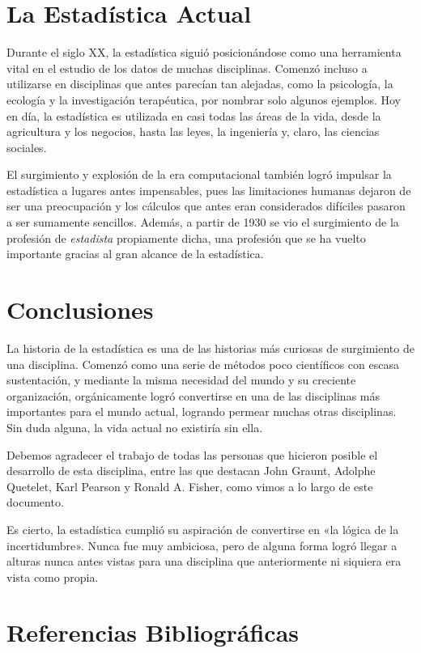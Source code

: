 \documentclass[12pt, a4paper]{article}
\begin{document}
\section{La Estadística Actual}

Durante el siglo XX, la estadística siguió posicionándose como una herramienta vital en el estudio de los datos de muchas disciplinas. Comenzó incluso a utilizarse en disciplinas que antes parecían tan alejadas, como la psicología, la ecología y la investigación terapéutica, por nombrar solo algunos ejemplos.  Hoy en día, la estadística es utilizada en casi todas las áreas de la vida, desde la agricultura y los negocios, hasta las leyes, la ingeniería y, claro, las ciencias sociales.

El surgimiento y explosión de la era computacional también logró impulsar la estadística a lugares antes impensables, pues las limitaciones humanas dejaron de ser una preocupación y los cálculos que antes eran considerados difíciles pasaron a ser sumamente sencillos. Además, a partir de 1930 se vio el surgimiento de la profesión de \textit{estadista} propiamente dicha, una profesión que se ha vuelto importante gracias al gran alcance de la estadística.

\section{Conclusiones}

La historia de la estadística es una de las historias más curiosas de surgimiento de una disciplina. Comenzó como una serie de métodos poco científicos con escasa sustentación, y mediante la misma necesidad del mundo y su creciente organización, orgánicamente logró convertirse en una de las disciplinas más importantes para el mundo actual, logrando permear muchas otras disciplinas. Sin duda alguna, la vida actual no existiría sin ella.

Debemos agradecer el trabajo de todas las personas que hicieron posible el desarrollo de esta disciplina, entre las que destacan John Graunt, Adolphe Quetelet, Karl Pearson y Ronald A. Fisher, como vimos a lo largo de este documento.

Es cierto, la estadística cumplió su aspiración de convertirse en «la lógica de la incertidumbre». Nunca fue muy ambiciosa, pero de alguna forma logró llegar a alturas nunca antes vistas para una disciplina que anteriormente ni siquiera era vista como propia.

\newpage

\section{Referencias Bibliográficas}
\end{document}
